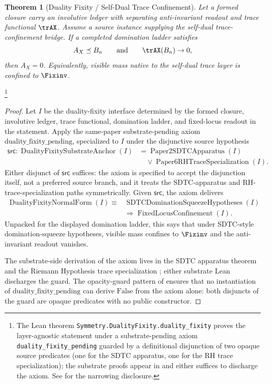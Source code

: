 \documentclass[11pt]{article}
\newtheorem{theorem}{Theorem}[section]
\theoremstyle{definition}
\begin{document}
\begin{theorem}[Duality Fixity / Self-Dual Trace Confinement]\label{thm:F14}
Let a formed closure carry an involutive ledger with separating
anti-invariant readout and trace functional \(\trAX\).  Assume a
source instance supplying the self-dual trace-confinement bridge.
If a completed domination ladder satisfies
\[
  A_X \preceq B_n
  \qquad\text{and}\qquad
  \trAX(B_n)\to 0,
\]
then \(A_X=0\).  Equivalently, visible mass native to the
self-dual trace layer is confined to \(\Fixinv\).
\end{theorem}
\footnote{The Lean theorem
\texttt{Symmetry.DualityFixity.duality\_fixity} proves the
layer-agnostic statement under a substrate-pending axiom
\texttt{duality\_fixity\_pending} guarded by a definitional
disjunction of two opaque source predicates (one for the SDTC
apparatus, one for the RH trace specialization); the substrate
proofs appear in \citep{Tsiokos2026SDTC, Tsiokos2026RH} and either
suffices to discharge the axiom.  See  for
the narrowing disclosure.}
\begin{proof}
Let \(I\) be the duality-fixity interface determined by the formed
closure, involutive ledger, trace functional, domination ladder, and
fixed-locus readout in the statement.  Apply the same-paper
substrate-pending axiom \(\mathrm{duality\_fixity\_pending}\),
specialized to \(I\) under the disjunctive source hypothesis
\begin{align*}
  \mathsf{src}:
  \operatorname{DualityFixitySubstrateAnchor}(I)
  &=
  \operatorname{Paper2SDTCApparatus}(I)\\
  &\quad{}\lor
  \operatorname{Paper6RHTraceSpecialization}(I).
\end{align*}
Either disjunct of \(\mathsf{src}\) suffices: the axiom is specified
to accept the disjunction itself, not a preferred source branch, and
it treats the SDTC-apparatus and RH-trace-specialization paths
symmetrically.  Given \(\mathsf{src}\), the axiom delivers
\begin{align*}
  \operatorname{DualityFixityNormalForm}(I)
  \equiv{}&
  \operatorname{SDTCDominationSqueezeHypotheses}(I)\\
  &{}\Longrightarrow
  \operatorname{FixedLocusConfinement}(I).
\end{align*}
Unpacked for the displayed domination ladder, this says that under
SDTC-style domination-squeeze hypotheses, visible mass confines to
\(\Fixinv\) and the anti-invariant readout vanishes.

The substrate-side derivation of the axiom lives in the SDTC
apparatus theorem \citep{Tsiokos2026SDTC} and the Riemann Hypothesis
trace specialization \citep{Tsiokos2026RH}; either substrate Lean
discharges the guard.  The opacity-guard pattern of
 ensures that no instantiation of
\(\mathrm{duality\_fixity\_pending}\) can derive \(\mathrm{False}\)
from the axiom alone: both disjuncts of the guard are opaque
predicates with no public constructor.
\end{proof}
\end{document}
